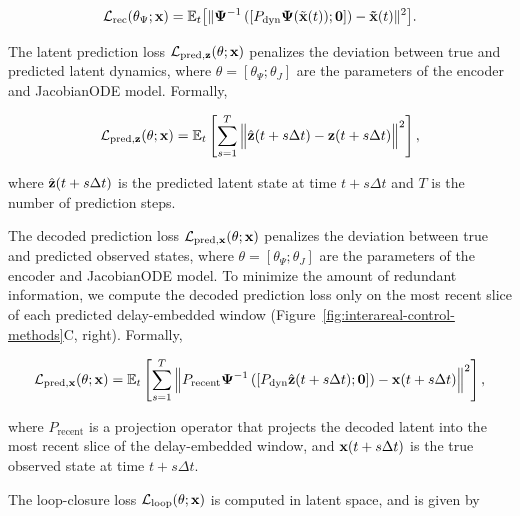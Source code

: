 \begin{equation}
\mathcal{L}_{\mathrm{rec}}(\theta_{\Psi};\vb{x}) = \mathbb{E}_t\big[\|\vb{\Psi}^{-1}\left([P_{\text{dyn}}\vb{\Psi}(\tilde{\vb{x}}(t)); \mathbf{0}]\right) - \vb{\tilde{x}}(t)\|^2\big].
\label{eq:interareal-control-reconstruction-loss}
\end{equation}

 The latent prediction loss $\mathcal{L}_{\mathrm{pred}, \mathbf{z}}(\theta;\vb{x})$ penalizes the deviation between true and predicted latent dynamics, where $\theta = [\theta_\Psi; \theta_J]$ are the parameters of the encoder and JacobianODE model. Formally,

\begin{equation}
\mathcal{L}_{\mathrm{pred}, \mathbf{z}}(\theta;\vb{x}) = \mathbb{E}_t\left[\sum_{s=1}^T\Big\|\hat{\vb{z}}(t+s\Delta t) - \vb{z}(t+s\Delta t)\Big\|^2\right],
\label{eq:interareal-control-latent-dynamics-loss}
\end{equation}

where $\hat{\vb{z}}(t+s\Delta t)$ is the predicted latent state at time $t+s\Delta t$ and $T$ is the number of prediction steps.

 The decoded prediction loss $\mathcal{L}_{\mathrm{pred}, \mathbf{x}}(\theta;\vb{x})$ penalizes the deviation between true and predicted observed states, where $\theta = [\theta_\Psi; \theta_J]$ are the parameters of the encoder and JacobianODE model. To minimize the amount of redundant information, we compute the decoded prediction loss only on the most recent slice of each predicted delay-embedded window (Figure~\ref{fig:interareal-control-methods}C, right). Formally,

\begin{equation}
\mathcal{L}_{\mathrm{pred}, \mathbf{x}}(\theta;\vb{x}) = \mathbb{E}_t\left[\sum_{s=1}^T\Big\|P_{\text{recent}}\vb{\Psi}^{-1}\left([P_{\text{dyn}}\hat{\vb{z}}(t+s\Delta t); \mathbf{0}]\right) - \vb{x}(t+s\Delta t)\Big\|^2\right],
\label{eq:interareal-control-decoded-prediction-loss}
\end{equation}

where $P_{\text{recent}}$ is a projection operator that projects the decoded latent into the most recent slice of the delay-embedded window, and $\vb{x}(t+s\Delta t)$ is the true observed state at time $t+s\Delta t$.

 The loop-closure loss $\mathcal{L}_{\mathrm{loop}}(\theta;\vb{x})$ is computed in latent space, and is given by

